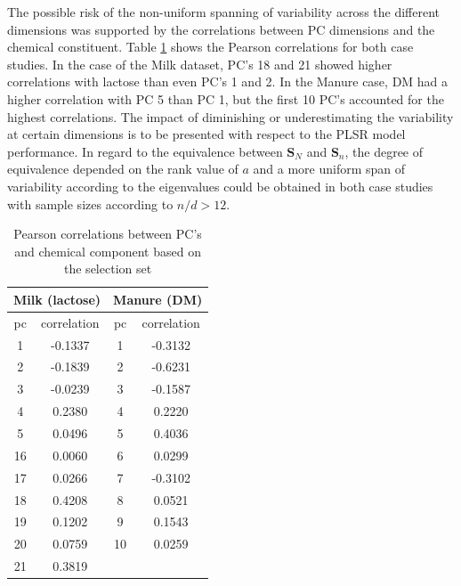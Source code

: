 \documentclass[journal=ancham,manuscript=article]{achemso}
\begin{document}
The possible risk of the non-uniform spanning of variability across the different dimensions was supported by the correlations between PC dimensions and the chemical constituent. Table \ref{tab_correlations} shows the Pearson correlations for both case studies. In the case of the Milk dataset, PC's 18 and 21 showed higher correlations with lactose than even PC's 1 and 2. In the Manure case, DM had a higher correlation with PC 5 than PC 1, but the first 10 PC's accounted for the highest correlations. The impact of diminishing or underestimating the variability at certain dimensions is to be presented with respect to the PLSR model performance. In regard to the equivalence between $\mathbf{S}_N$ and $\mathbf{S}_n$, the degree of equivalence depended on the rank value of $a$ and a more uniform span of variability according to the eigenvalues could be obtained in both case studies with sample sizes according to $n/d>12$.  

\begin{table}[t]
\centering
\begin{tabular}{|cc|cc|} 
\hline
\multicolumn{2}{|c|}{Milk (lactose)} & \multicolumn{2}{|c|}{Manure (DM)}\\
\hline
pc	& correlation	&  pc & correlation	\\
\hline
  1 & -0.1337 & 1 & -0.3132 \\
  2 & -0.1839 & 2 & -0.6231 \\
  3 & -0.0239 & 3 & -0.1587 \\
  4 &  0.2380 & 4 &  0.2220 \\
  5 &  0.0496 & 5 &  0.4036 \\
 16 &  0.0060 & 6 &  0.0299 \\
 17 &  0.0266 & 7 & -0.3102 \\
 18 &  0.4208 & 8 & 0.0521 \\
 19 &  0.1202 & 9 & 0.1543 \\
 20 &  0.0759 & 10& 0.0259 \\
 21 &  0.3819 &  & \\
 \hline
\end{tabular}
\caption{Pearson correlations between PC's and chemical component based on the selection set}
\label{tab_correlations}
\end{table}
\end{document}
